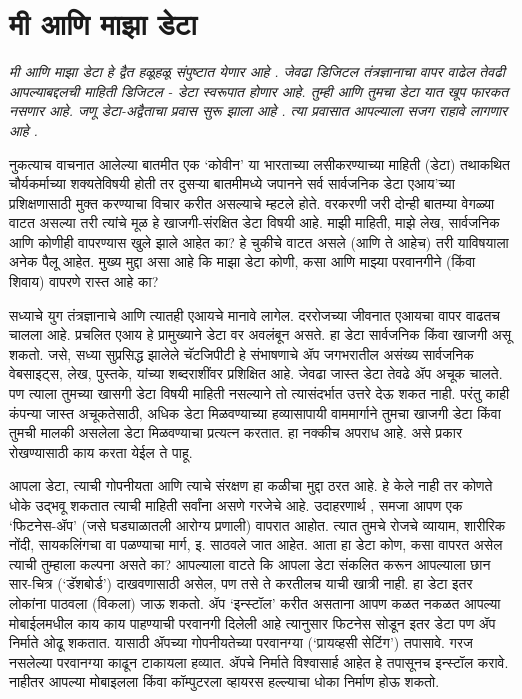 \chapter{मी आणि माझा डेटा}

{\textit{मी आणि माझा डेटा हे द्वैत हळूहळू संपुष्टात येणार आहे .  जेवढा डिजिटल तंत्रज्ञानाचा वापर वाढेल तेवढी आपल्याबद्दलची माहिती डिजिटल - डेटा स्वरूपात होणार आहे. तुम्ही आणि तुमचा डेटा  यात खूप फारकत नसणार आहे. जणू डेटा-अद्वैताचा प्रवास सुरू झाला आहे .  त्या प्रवासात आपल्याला सजग राहावे लागणार आहे . }}

\vspace{1.5em}

नुकत्याच वाचनात आलेल्या बातमीत एक  `कोवीन' या भारताच्या लसीकरण्याच्या माहिती (डेटा) तथाकथित चौर्यकर्माच्या शक्यतेविषयी होती तर दुसऱ्या बातमीमध्ये जपानने सर्व सार्वजनिक डेटा एआय'च्या प्रशिक्षणासाठी मुक्त करण्याचा विचार करीत असल्याचे म्हटले होते. वरकरणी जरी दोन्ही बातम्या वेगळ्या वाटत असल्या तरी त्यांचे मूळ हे खाजगी-संरक्षित डेटा विषयी आहे. माझी माहिती, माझे लेख, सार्वजनिक आणि कोणीही वापरण्यास खुले झाले आहेत का? हे चुकीचे वाटत असले (आणि ते आहेच) तरी याविषयाला अनेक पैलू आहेत. मुख्य मुद्दा असा आहे कि माझा डेटा कोणी, कसा आणि माझ्या परवानगीने (किंवा शिवाय) वापरणे रास्त आहे का?

सध्याचे युग तंत्रज्ञानाचे आणि त्यातही एआयचे मानावे लागेल. दररोजच्या जीवनात एआयचा वापर वाढतच चालला आहे. प्रचलित एआय हे प्रामुख्याने डेटा वर अवलंबून असते. हा डेटा सार्वजनिक किंवा खाजगी असू शकतो. जसे, सध्या सुप्रसिद्ध झालेले चॅटजिपीटी हे संभाषणाचे ॲप जगभरातील असंख्य सार्वजनिक वेबसाइट्स, लेख, पुस्तके, यांच्या शब्दराशींवर प्रशिक्षित आहे. जेवढा जास्त डेटा तेवढे ॲप अचूक चालते. पण त्याला तुमच्या खासगी डेटा विषयी माहिती नसल्याने तो त्यासंदर्भात उत्तरे देऊ शकत नाही. परंतु काही कंपन्या जास्त अचूकतेसाठी, अधिक डेटा मिळवण्याच्या हव्यासापायी वाममार्गाने तुमचा खाजगी डेटा किंवा तुमची मालकी असलेला डेटा मिळवण्याचा प्रत्यत्न करतात. हा नक्कीच अपराध आहे. असे प्रकार रोखण्यासाठी काय करता येईल  ते पाहू.

आपला डेटा, त्याची गोपनीयता आणि त्याचे संरक्षण हा कळीचा मुद्दा ठरत आहे. हे केले नाही तर कोणते धोके उद्भवू शकतात त्याची माहिती सर्वांना असणे गरजेचे आहे. उदाहरणार्थ , समजा आपण एक `फिटनेस-ॲप' (जसे घड्याळातली आरोग्य प्रणाली) वापरात आहोत. त्यात तुमचे रोजचे व्यायाम, शारीरिक नोंदी, सायकलिंगचा वा पळण्याचा मार्ग, इ. साठवले जात आहेत. आता हा डेटा कोण, कसा वापरत असेल त्याची तुम्हाला कल्पना असते का? आपल्याला वाटते कि आपला डेटा संकलित करून आपल्याला छान सार-चित्र (`डॅशबोर्ड') दाखवणासाठी असेल, पण तसे ते करतीलच याची खात्री नाही. हा डेटा इतर लोकांना पाठवला (विकला) जाऊ शकतो. ॲप `इन्स्टॉल' करीत असताना आपण कळत नकळत आपल्या मोबाईलमधील काय काय पाहण्याची परवानगी दिलेली आहे त्यानुसार फिटनेस सोडून इतर डेटा पण ॲप निर्माते ओढू शकतात. यासाठी ॲपच्या गोपनीयतेच्या परवानग्या (`प्रायव्हसी सेटिंग') तपासावे. गरज नसलेल्या परवानग्या काढून टाकायला हव्यात. ॲपचे निर्माते विश्वासार्ह आहेत हे तपासूनच इन्स्टॉल करावे. नाहीतर आपल्या मोबाइलला किंवा कॉम्पुटरला व्हायरस हल्ल्याचा धोका निर्माण होऊ शकतो.

